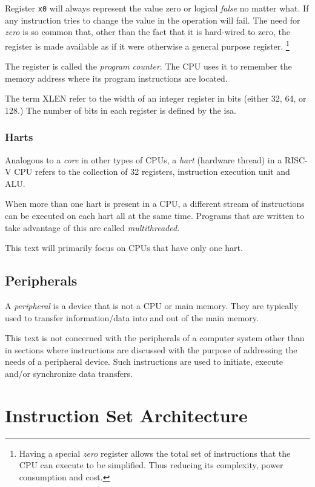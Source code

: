 Register \texttt{x0} will always represent the value zero or logical {\em false}
no matter what.  If any instruction tries to change the value in  the
operation will fail.  The need for {\em zero} is so common that, other than the
fact that it is hard-wired to zero, the  register is made available as
if it were otherwise a general purpose register.%
\footnote{Having a special
{\em zero} register allows the total set of instructions that the CPU can execute
to be simplified.  Thus reducing its complexity, power consumption and cost.}

The  register is called the {\em program counter}.  The CPU uses it to
remember the memory address where its program instructions are located.

The term XLEN refer to the width of an integer register in bits (either 32, 64, or 128.)
The number of bits in each register is defined by the \acrfull{isa}.

\subsubsection{Harts}

Analogous to a {\em core} in other types of CPUs, a {\em \acrshort{hart}}
(hardware \gls{thread}) in a RISC-V CPU refers to the collection of 32 registers,
instruction execution unit and ALU.\cite[p.~20]{rvismv1v22:2017}

When more than one hart is present in a CPU, a different stream of instructions can
be executed on each hart all at the same time.
Programs that are written to take advantage of this are called {\em multithreaded}.

This text will primarily focus on CPUs that have only one hart.

\subsection{Peripherals}

A {\em peripheral} is a device that is not a CPU or main memory.  They are
typically used to transfer information/data into and out of the
main memory.

This text is not concerned with the peripherals of a computer
system other than in sections where instructions are discussed with the
purpose of addressing the needs of a peripheral device.  Such
instructions are used to initiate, execute and/or synchronize data transfers.


\section{Instruction Set Architecture}

